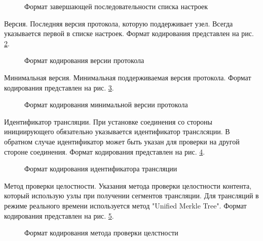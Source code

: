 		\begin{figure}[h]
			\caption{Формат завершающей последовательности списка настроек}
			\label{img:ppspp-end-option}
		\end{figure}

		Версия. Последняя версия протокола, которую поддерживает узел. Всегда указывается первой в списке
		настроек. Формат кодирования представлен на рис. \ref{img:ppspp-version-option}.

		\begin{figure}[h]
			\caption{Формат кодирования версии протокола}
			\label{img:ppspp-version-option}
		\end{figure}

		\newpage
		Минимальная версия. Минимальная поддерживаемая версия протокола. Формат кодирования представлен на рис.
		 \ref{img:ppspp-min-version-option}.

		\begin{figure}[h]
			\caption{Формат кодирования минимальной версии протокола}
			\label{img:ppspp-min-version-option}
		\end{figure}

		Идентификатор трансляции. При установке соединения со стороны инициирующего обязательно указывается
		идентификатор транслсяции. В обратном случае идентификатор может быть указан для проверки на другой стороне
		соединения. Формат кодирования представлен на рис. \ref{img:ppspp-swarm-id-option}.

		\begin{figure}[h]
			\caption{Формат кодирования идентификатора трансляции}
			\label{img:ppspp-swarm-id-option}
		\end{figure}

		Метод проверки целостности. Указания метода проверки целостности контента, который использую узлы при
		получении сегментов трансляции. Для трансляций в режиме реального времени используется метод
		"Unified Merkle Tree". Формат кодирования представлен на рис. \ref{img:ppspp-cimp-option}.

		\begin{figure}[h]
			\caption{Формат кодирования метода проверки целстности}
			\label{img:ppspp-cimp-option}
		\end{figure}

